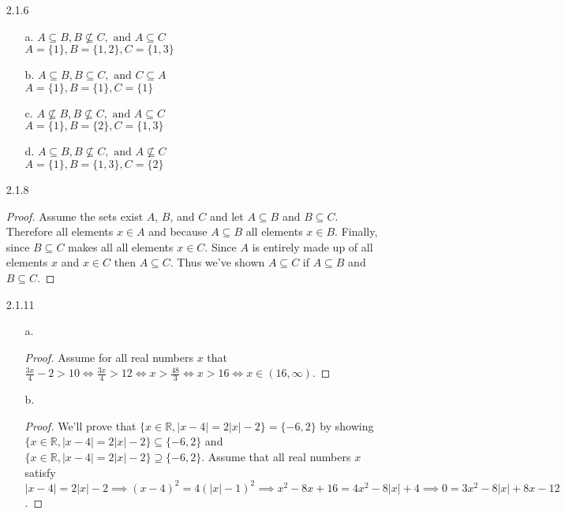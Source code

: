 \documentclass[11pt]{amsart}
\theoremstyle{definition}
\begin{document}
\begin{itemize}
\begin{itemize}
\end{itemize}

\item[2.1.6]
\begin{itemize}
    \item[a.] $A\subseteq B, B\nsubseteq C,\text{ and }A\subseteq C$ \\
              $A=\{1\},B=\{1,2\},C=\{1,3\}$

    \item[b.] $A\subseteq B,B\subseteq C,\text{ and }C\subseteq A$ \\
              $A=\{1\},B=\{1\},C=\{1\}$

    \item[c.] $A\nsubseteq B, B\nsubseteq C,\text{ and }A\subseteq C$ \\
              $A=\{1\},B=\{2\},C=\{1,3\}$

    \item[d.] $A\subseteq B, B\nsubseteq C,\text{ and }A\nsubseteq C$ \\
              $A=\{1\},B=\{1,3\},C=\{2\}$

\end{itemize}

\item[2.1.8] \begin{proof}
    Assume the sets exist $A$, $B$, and $C$ and let $A\subseteq B$ and $B\subseteq C$. Therefore all elements $x\in A$ and because $A\subseteq B$ all elements $x\in B$. Finally, since $B\subseteq C$ makes all all elements $x\in C$. Since $A$ is entirely made up of all elements $x$ and $x\in C$ then $A\subseteq C$. Thus we've shown $A\subseteq C$ if $A\subseteq B$ and $B\subseteq C$.
\end{proof}

\item[2.1.11]
\begin{itemize}
    \item[a.] \begin{proof}
        Assume for all real numbers $x$ that $\frac{3x}{4}-2>10\iff \frac{3x}{4}>12\iff x>\frac{48}{3}\iff x>16\iff x\in(16,\infty ).$
    \end{proof}

    \item[b.] \begin{proof}
        We'll prove that $\{x\in\mathbb{R},|x-4|=2|x|-2\}=\{-6,2\}$ by showing $\{x\in\mathbb{R},|x-4|=2|x|-2\}\subseteq\{-6,2\}$ and $\{x\in\mathbb{R},|x-4|=2|x|-2\}\supseteq\{-6,2\}$.
        Assume that all real numbers $x$ satisfy $|x-4|=2|x|-2\implies (x-4)^2=4(|x|-1)^2
        \implies x^2-8x+16=4x^2-8|x|+4\implies 0=3x^2-8|x|+8x-12$.

\end{proof}
\end{itemize}
\end{itemize}
\end{document}
